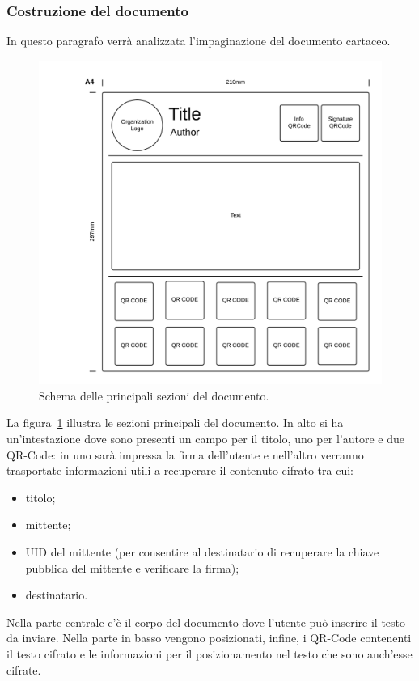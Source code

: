 \subsubsection{Costruzione del documento}
In questo paragrafo verrà analizzata l'impaginazione del documento cartaceo.
	\begin{center}	
		\begin{figure}[H]
		\centering
		\includegraphics[scale=0.7]{Immagini/template}
		\caption[Template del documento]{Schema delle principali sezioni del documento.}
		\label{fig:template}
		\end{figure}
	\end{center}
La figura~\ref{fig:template} illustra le sezioni principali del documento. In alto si ha un'intestazione dove sono presenti un campo per il titolo, uno per l'autore e due QR-Code: in uno sarà impressa la firma dell'utente e nell'altro verranno trasportate informazioni utili a recuperare il contenuto cifrato tra cui:
\begin{itemize}
	\item titolo;
	\item mittente;
	\item UID del mittente (per consentire al destinatario di recuperare la chiave pubblica del mittente e verificare la firma);
	\item destinatario.
\end{itemize}
Nella parte centrale c'è il corpo del documento dove l'utente può inserire il testo da inviare.
Nella parte in basso vengono posizionati, infine, i QR-Code contenenti il testo cifrato e le informazioni per il posizionamento nel testo che sono anch'esse cifrate.

